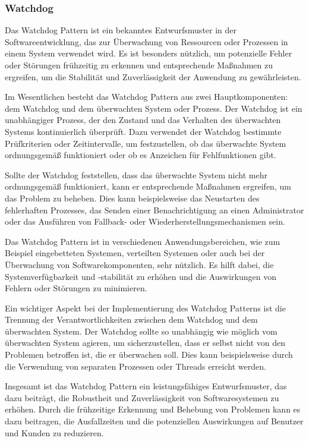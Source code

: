 \subsubsection{Watchdog}
Das Watchdog Pattern ist ein bekanntes Entwurfsmuster in der Softwareentwicklung, das zur Überwachung von Ressourcen oder Prozessen in einem System verwendet wird. Es ist besonders nützlich, um potenzielle Fehler oder Störungen frühzeitig zu erkennen und entsprechende Maßnahmen zu ergreifen, um die Stabilität und Zuverlässigkeit der Anwendung zu gewährleisten.

Im Wesentlichen besteht das Watchdog Pattern aus zwei Hauptkomponenten: dem Watchdog und dem überwachten System oder Prozess. Der Watchdog ist ein unabhängiger Prozess, der den Zustand und das Verhalten des überwachten Systems kontinuierlich überprüft. Dazu verwendet der Watchdog bestimmte Prüfkriterien oder Zeitintervalle, um festzustellen, ob das überwachte System ordnungsgemäß funktioniert oder ob es Anzeichen für Fehlfunktionen gibt.

Sollte der Watchdog feststellen, dass das überwachte System nicht mehr ordnungsgemäß funktioniert, kann er entsprechende Maßnahmen ergreifen, um das Problem zu beheben. Dies kann beispielsweise das Neustarten des fehlerhaften Prozesses, das Senden einer Benachrichtigung an einen Administrator oder das Ausführen von Fallback- oder Wiederherstellungsmechanismen sein.

Das Watchdog Pattern ist in verschiedenen Anwendungsbereichen, wie zum Beispiel eingebetteten Systemen, verteilten Systemen oder auch bei der Überwachung von Softwarekomponenten, sehr nützlich. Es hilft dabei, die Systemverfügbarkeit und -stabilität zu erhöhen und die Auswirkungen von Fehlern oder Störungen zu minimieren.

Ein wichtiger Aspekt bei der Implementierung des Watchdog Patterns ist die Trennung der Verantwortlichkeiten zwischen dem Watchdog und dem überwachten System. Der Watchdog sollte so unabhängig wie möglich vom überwachten System agieren, um sicherzustellen, dass er selbst nicht von den Problemen betroffen ist, die er überwachen soll. Dies kann beispielsweise durch die Verwendung von separaten Prozessen oder Threads erreicht werden.

Insgesamt ist das Watchdog Pattern ein leistungsfähiges Entwurfsmuster, das dazu beiträgt, die Robustheit und Zuverlässigkeit von Softwaresystemen zu erhöhen. Durch die frühzeitige Erkennung und Behebung von Problemen kann es dazu beitragen, die Ausfallzeiten und die potenziellen Auswirkungen auf Benutzer und Kunden zu reduzieren.

